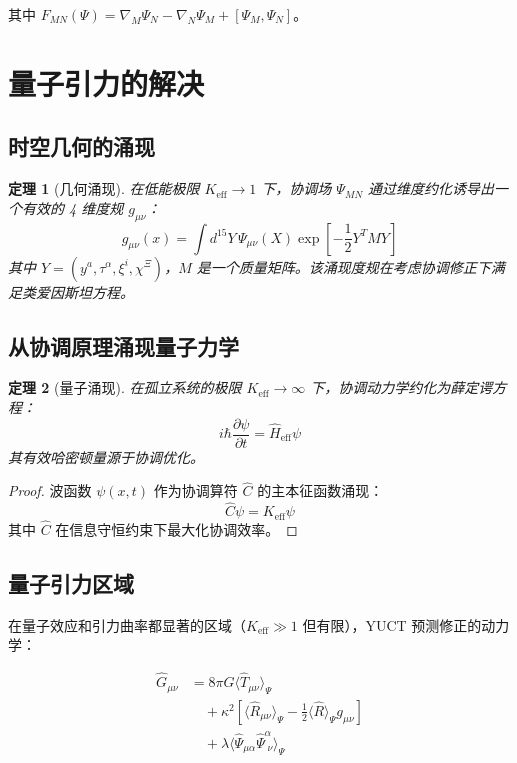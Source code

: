 \documentclass[11pt,a4paper]{article}
\newcommand{\eff}{\text{eff}}
\newtheorem{theorem}{定理}[section]
\theoremstyle{remark}
\newcommand{\Keff}{K_{\mathrm{eff}}}
\begin{document}
	其中 $F_{MN}(\Psi) = \nabla_M \Psi_N - \nabla_N \Psi_M + [\Psi_M, \Psi_N]$。
	
	\section{量子引力的解决}
	\label{sec:quantum-gravity-resolution}
	
	\subsection{时空几何的涌现}
	
	\begin{theorem}[几何涌现]
		在低能极限 $\Keff \to 1$ 下，协调场 $\Psi_{MN}$ 通过维度约化诱导出一个有效的 4 维度规 $g_{\mu\nu}$：
		\[
		g_{\mu\nu}(x) = \int d^{15}Y \, \Psi_{\mu\nu}(X) \exp\left[-\frac{1}{2}Y^T M Y\right]
		\]
		其中 $Y = (y^a, \tau^\alpha, \xi^i, \chi^\Xi)$，$M$ 是一个质量矩阵。该涌现度规在考虑协调修正下满足类爱因斯坦方程。
	\end{theorem}
	
	\subsection{从协调原理涌现量子力学}
	
	\begin{theorem}[量子涌现]
		在孤立系统的极限 $\Keff \to \infty$ 下，协调动力学约化为薛定谔方程：
		\[
		i\hbar \frac{\partial \psi}{\partial t} = \hat{H}_{\eff} \psi
		\]
		其有效哈密顿量源于协调优化。
	\end{theorem}
	
	\begin{proof}
		波函数 $\psi(x,t)$ 作为协调算符 $\hat{C}$ 的主本征函数涌现：
		\[
		\hat{C} \psi = \Keff \psi
		\]
		其中 $\hat{C}$ 在信息守恒约束下最大化协调效率。
	\end{proof}
	
	\subsection{量子引力区域}
	
	在量子效应和引力曲率都显著的区域（$\Keff \gg 1$ 但有限），YUCT 预测修正的动力学：
	
	\begin{equation}
		\begin{aligned}
			\hat{G}_{\mu\nu} &= 8\pi G \langle \hat{T}_{\mu\nu} \rangle_{\Psi} \\
			&\quad + \kappa^2 \left[ \langle \hat{R}_{\mu\nu} \rangle_{\Psi} - \frac{1}{2} \langle \hat{R} \rangle_{\Psi} g_{\mu\nu} \right] \\
			&\quad + \lambda \langle \hat{\Psi}_{\mu\alpha} \hat{\Psi}^{\alpha}_{\;\nu} \rangle_{\Psi}
		\end{aligned}
	\end{equation}
	
\end{document}
